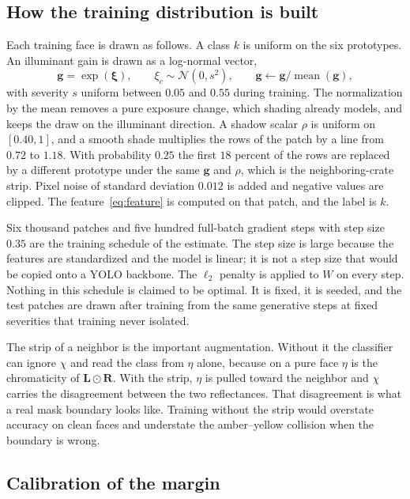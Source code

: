 \subsection{How the training distribution is built}
\label{sec:icph-train}

Each training face is drawn as follows. A class $k$ is uniform on the six prototypes. An illuminant gain is drawn as a log-normal vector,
\begin{equation}
\mathbf{g} = \exp(\boldsymbol{\xi}),
\qquad
\xi_c \sim \mathcal{N}(0,s^{2}),
\qquad
\mathbf{g}\gets \mathbf{g}/\operatorname{mean}(\mathbf{g}),
\label{eq:gain}
\end{equation}
with severity $s$ uniform between $0.05$ and $0.55$ during training. The normalization by the mean removes a pure exposure change, which shading already models, and keeps the draw on the illuminant direction. A shadow scalar $\rho$ is uniform on $[0.40,1]$, and a smooth shade multiplies the rows of the patch by a line from $0.72$ to $1.18$. With probability $0.25$ the first $18$ percent of the rows are replaced by a different prototype under the same $\mathbf{g}$ and $\rho$, which is the neighboring-crate strip. Pixel noise of standard deviation $0.012$ is added and negative values are clipped. The feature~\eqref{eq:feature} is computed on that patch, and the label is $k$.

Six thousand patches and five hundred full-batch gradient steps with step size $0.35$ are the training schedule of the estimate. The step size is large because the features are standardized and the model is linear; it is not a step size that would be copied onto a YOLO backbone. The $\ell_2$ penalty is applied to $W$ on every step. Nothing in this schedule is claimed to be optimal. It is fixed, it is seeded, and the test patches are drawn after training from the same generative steps at fixed severities that training never isolated.

The strip of a neighbor is the important augmentation. Without it the classifier can ignore $\chi$ and read the class from $\eta$ alone, because on a pure face $\eta$ is the chromaticity of $\mathbf{L}\odot\mathbf{R}$. With the strip, $\eta$ is pulled toward the neighbor and $\chi$ carries the disagreement between the two reflectances. That disagreement is what a real mask boundary looks like. Training without the strip would overstate accuracy on clean faces and understate the amber--yellow collision when the boundary is wrong.

\subsection{Calibration of the margin}
\label{sec:icph-margin}


